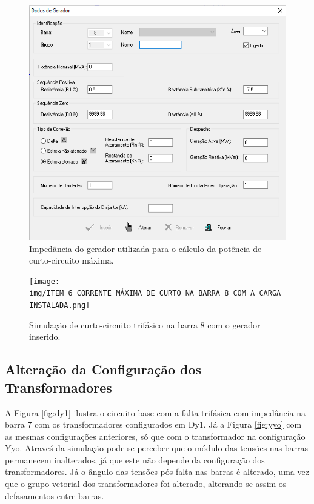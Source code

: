 \documentclass[a4paper, 12pt]{article}
\begin{document}
\begin{figure}[h]
\centering
  \includegraphics[scale=0.35]{img/ITEM 6 - DADOS DO TRAFO UTILIZADO.png}
\caption{Impedância do gerador utilizada para o cálculo da potência de curto-circuito máxima.}
\label{fig:item62}
\end{figure}

\begin{figure}[h]
\centering
  \texttt{[image: img/ITEM\_6\_CORRENTE\_MÁXIMA\_DE\_CURTO\_NA\_BARRA\_8\_COM\_A\_CARGA\_INSTALADA.png]}
\caption{Simulação de curto-circuito trifásico na barra 8 com o gerador inserido.}
\label{fig:item63}
\end{figure}

\subsection{Alteração da Configuração dos Transformadores}
A Figura \ref{fig:dy1} ilustra o circuito base com a falta trifásica com impedância na barra 7 com os transformadores configurados em Dy1. Já a Figura \ref{fig:yyo} com as mesmas configurações anteriores, só que com o transformador na configuração Yyo. Atraveś da simulação pode-se perceber que o módulo das tensões nas barras permanecem inalterados, já que este não depende da configuração dos transformadores. Já o ângulo das tensões pós-falta nas barras é alterado, uma vez que o grupo vetorial dos transformadores foi alterado, alterando-se assim os defasamentos entre barras. 
\end{document}
